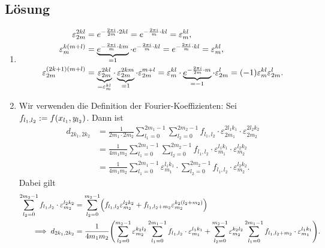 \documentclass{exercise}
\begin{document}
    \subsection*{Lösung}
    \begin{enumerate}
        \item
        \begin{align*}
            \varepsilon_{2m}^{2kl} &= e^{-\frac{2\pi i}{2m} \cdot 2kl} = e^{-\frac{2\pi i}{m} \cdot kl} = \varepsilon_m^{kl},\\
            \varepsilon_m^{k\parentheses*{m + l}} &= \underbrace{e^{-\frac{2\pi i}{m} \cdot km}}_{= 1} \cdot e^{-\frac{2\pi i}{m} \cdot kl} = e^{-\frac{2\pi i}{m} \cdot kl} = \varepsilon_m^{kl},\\
            \varepsilon_{2m}^{\parentheses*{2k + 1}\parentheses*{m + l}} &= \underbrace{\varepsilon_{2m}^{2kl}}_{= \varepsilon_m^{kl}} \cdot \underbrace{\varepsilon_{2m}^{2km}}_{= 1} \cdot \varepsilon_{2m}^{m + l} = \varepsilon_m^{kl} \cdot \underbrace{e^{-\frac{2\pi i}{2m} \cdot m}}_{= -1} \cdot \varepsilon_{2m}^l = \parentheses*{-1}\varepsilon_m^{kl}\varepsilon_{2m}^l.
        \end{align*}
        \item Wir verwenden die Definition der Fourier-Koeffizienten: Sei \(f_{l_1, l_2} := f\parentheses*{x_{l_1}, y_{l_2}}\).
        Dann ist
        \begin{align*}
            d_{2k_1, 2k_2} &= \frac{1}{2m_1 \cdot 2m_2}\sum_{l_1 = 0}^{2m_1 - 1}\sum_{l_2 = 0}^{2m_2 - 1}f_{l_1, l_2} \cdot \varepsilon_{2m_1}^{2l_1 k_1} \cdot \varepsilon_{2m_2}^{2l_2 k_2}\\
            &= \frac{1}{4m_1 m_2}\sum_{l_1 = 0}^{2m_1 - 1}\sum_{l_2 = 0}^{2m_2 - 1}f_{l_1, l_2} \cdot \varepsilon_{m_1}^{l_1 k_1} \cdot \varepsilon_{m_2}^{l_2 k_2}\\
            &= \frac{1}{4m_1 m_2}\sum_{l_1 = 0}^{2m_1 - 1}\varepsilon_{m_1}^{l_1 k_1} \cdot \sum_{l_2 = 0}^{2m_2 - 1}f_{l_1, l_2} \cdot \varepsilon_{m_2}^{l_2 k_2}.
        \end{align*}
        Dabei gilt
        \begin{align*}
            \sum_{l_2 = 0}^{2m_2 - 1}f_{l_1, l_2} \cdot \varepsilon_{m_2}^{l_2 k_2} &= \sum_{l_2 = 0}^{m_2 - 1}\parentheses*{f_{l_1, l_2}\varepsilon_{m_2}^{l_2 k_2} + f_{l_1, l_2 + m_2}\varepsilon_{m_2}^{k_2\parentheses*{l_2 + m_2}}}\\
            \implies d_{2k_1, 2k_2} &= \frac{1}{4m_1 m_2}\parentheses*{\sum_{l_2 = 0}^{m_2 - 1}\varepsilon_{m_2}^{k_2 l_2}\sum_{l_1 = 0}^{2m_1 - 1}f_{l_1, l_2} \cdot \varepsilon_{m_1}^{l_1 k_1} + \sum_{l_2 = 0}^{m_2 - 1}\varepsilon_{m_2}^{k_2 l_2}\sum_{l_1 = 0}^{2m_1 - 1}f_{l_1, l_2 + m_2} \cdot \varepsilon_{m_1}^{l_1 k_1}}.

\end{align*}
\end{enumerate}
\end{document}
